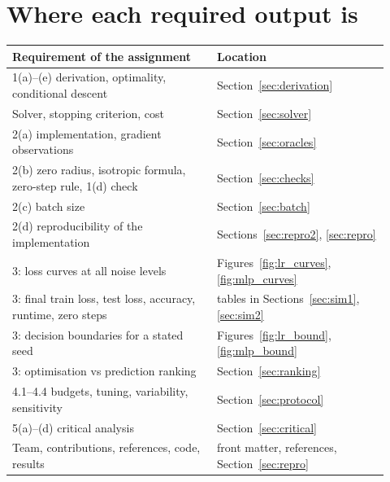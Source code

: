 \documentclass[11pt,a4paper]{article}
\begin{document}
\section{Where each required output is}\label{app:map}
\begin{center}
\small
\begin{tabular}{@{}p{0.5\linewidth}p{0.42\linewidth}@{}}
\toprule
Requirement of the assignment & Location \\
\midrule
1(a)--(e) derivation, optimality, conditional descent & Section~\ref{sec:derivation} \\
Solver, stopping criterion, cost & Section~\ref{sec:solver} \\
2(a) implementation, gradient observations & Section~\ref{sec:oracles} \\
2(b) zero radius, isotropic formula, zero-step rule, 1(d) check & Section~\ref{sec:checks} \\
2(c) batch size & Section~\ref{sec:batch} \\
2(d) reproducibility of the implementation & Sections~\ref{sec:repro2}, \ref{sec:repro} \\
3: loss curves at all noise levels & Figures~\ref{fig:lr_curves}, \ref{fig:mlp_curves} \\
3: final train loss, test loss, accuracy, runtime, zero steps & tables in Sections~\ref{sec:sim1}, \ref{sec:sim2} \\
3: decision boundaries for a stated seed & Figures~\ref{fig:lr_bound}, \ref{fig:mlp_bound} \\
3: optimisation vs prediction ranking & Section~\ref{sec:ranking} \\
4.1--4.4 budgets, tuning, variability, sensitivity & Section~\ref{sec:protocol} \\
5(a)--(d) critical analysis & Section~\ref{sec:critical} \\
Team, contributions, references, code, results & front matter, references, Section~\ref{sec:repro} \\
\bottomrule
\end{tabular}
\end{center}
\end{document}
